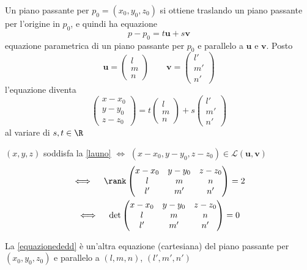 Un piano passante per $ p_0=(x_0, y_0, z_0) $ si ottiene traslando un piano passante per l'origine in $ p_0 $, e quindi ha equazione \[
    p-p_0=t\mathbf{u}+s\mathbf{v}
\]
equazione parametrica di un piano passante per $ p_0 $ e parallelo a $ \mathbf{u} $ e $ \mathbf{v} $. Posto \[
    \mathbf{u}=\begin{pmatrix}
        l\\m\\n
    \end{pmatrix}\qquad \mathbf{v}=\begin{pmatrix}
        l'\\m'\\n'
    \end{pmatrix}
\]
l'equazione diventa
\begin{equation}
    \begin{pmatrix}
        x-x_0\\ y-y_0\\ z-z_0
    \end{pmatrix}=t \begin{pmatrix}
        l\\m\\n
    \end{pmatrix}+s\begin{pmatrix}
        l'\\m'\\n'
    \end{pmatrix}\label{launo}
\end{equation}
al variare di $ s, t \in \R $

$ (x,y,z) $ soddisfa la \eqref{launo} $ \iff $ $ (x-x_0, y-y_0, z-z_0) \in \mathscr{L}(\mathbf{u}, \mathbf{v}) $
\begin{gather}
    \iff \quad\rank \begin{pmatrix}
        x-x_0 & y-y_0 & z-z_0\\
        l & m &n \\
        l' & m' & n'
    \end{pmatrix}=2\nonumber \\
    \iff\quad \det\begin{pmatrix}
        x-x_0 & y-y_0 & z-z_0\\
        l & m &n \\
        l' & m' & n'
    \end{pmatrix}=0\label{equazionededd}
\end{gather}

La \eqref{equazionededd} è un'altra equazione (cartesiana) del piano passante per $ (x_0, y_0, z_0) $ e parallelo a $ (l, m, n) $, $ (l', m', n') $

